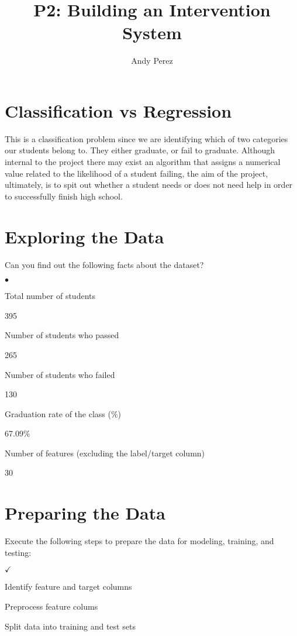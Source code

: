 \documentclass{amsart}
\begin{document}
\title{P2: Building an Intervention System}
\author{Andy Perez}
\maketitle
\section{Classification vs Regression}
This is a classification problem since we are identifying which of two categories our students belong to.  They either graduate, or fail to graduate.  Although internal to the project there may exist an algorithm that assigns a numerical value related to the likelihood of a student failing, the aim of the project, ultimately, is to spit out whether a student needs or does not need help in order to successfully finish high school.

\section{Exploring the Data}
Can you find out the following facts about the dataset?
\begin{list}{$\bullet$}{\addtolength{\parsep}{1mm}}
	\item Total number of students 
	
	395
	\item Number of students who passed 
	
	265
	\item Number of students who failed

	130

	\item Graduation rate of the class (\%) 

	67.09\%
	\item Number of features (excluding the label/target column)
 
	30 
\end{list}
\section{Preparing the Data}

Execute the following steps to prepare the data for modeling, training, and testing:

\begin{list}{$\checkmark$}{\addtolength{\parsep}{1mm}}
	\item Identify feature and target columns

	\item Preprocess feature colums

	\item Split data into training and test sets
\end{list}
\end{document}
